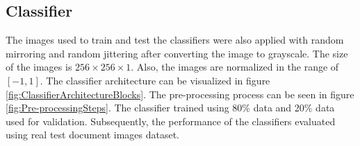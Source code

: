 \subsection{Classifier}
The images used to train and test the classifiers were also applied with random mirroring and random jittering after converting the image to grayscale. The size of the images is $256 \times 256 \times 1$. Also, the images are normalized in the range of $[-1, 1]$. The classifier architecture can be visualized in figure \ref{fig:ClassifierArchitectureBlocks}. The pre-processing process can be seen in figure \ref{fig:Pre-processingSteps}. The classifier trained using 80\% data and 20\% data used for validation. Subsequently, the performance of the classifiers evaluated using real test document images dataset.
















































































